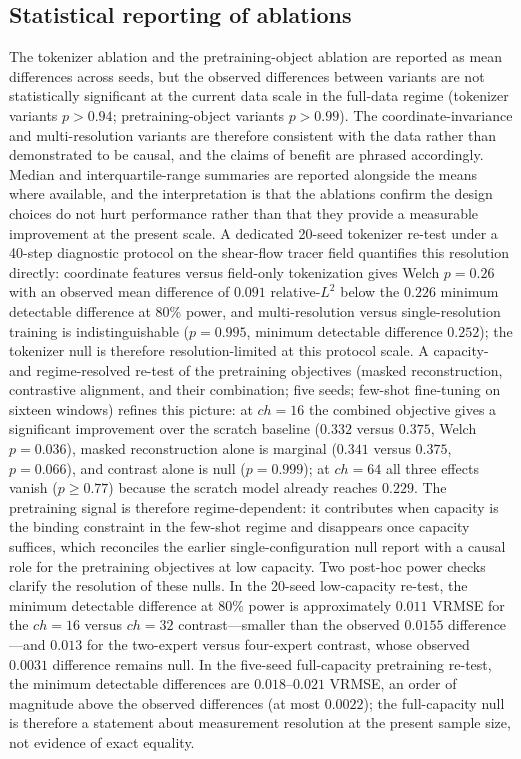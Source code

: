 \documentclass[preprint,12pt]{elsarticle}
\begin{document}
\subsection{Statistical reporting of ablations}
The tokenizer ablation and the pretraining-object ablation are reported as mean differences across
seeds, but the observed differences between variants are not statistically significant at the
current data scale in the full-data regime (tokenizer variants $p>0.94$; pretraining-object variants
$p>0.99$). The coordinate-invariance and multi-resolution variants are therefore consistent with the
data rather than demonstrated to be causal, and the claims of benefit are phrased accordingly. Median
and interquartile-range summaries are reported alongside the means where available, and the
interpretation is that the ablations confirm the design choices do not hurt performance rather than
that they provide a measurable improvement at the present scale. A dedicated 20-seed tokenizer
re-test under a 40-step diagnostic protocol on the shear-flow tracer field quantifies this
resolution directly: coordinate features versus field-only tokenization gives Welch $p=0.26$ with
an observed mean difference of $0.091$ relative-$L^2$ below the $0.226$ minimum detectable
difference at 80\% power, and multi-resolution versus single-resolution training is
indistinguishable ($p=0.995$, minimum detectable difference $0.252$); the tokenizer null is
therefore resolution-limited at this protocol scale. A capacity- and regime-resolved
re-test of the pretraining objectives (masked reconstruction, contrastive alignment, and their
combination; five seeds; few-shot fine-tuning on sixteen windows) refines this picture: at $ch=16$
the combined objective gives a significant improvement over the scratch baseline ($0.332$ versus
$0.375$, Welch $p=0.036$), masked reconstruction alone is marginal ($0.341$ versus $0.375$,
$p=0.066$), and contrast alone is null ($p=0.999$); at $ch=64$ all three effects vanish
($p\ge0.77$) because the scratch model already reaches $0.229$. The pretraining signal is therefore
regime-dependent: it contributes when capacity is the binding constraint in the few-shot regime and
disappears once capacity suffices, which reconciles the earlier single-configuration null report
with a causal role for the pretraining objectives at low capacity. Two post-hoc power checks
clarify the resolution of these nulls. In the 20-seed low-capacity re-test, the minimum detectable
difference at 80\% power is approximately $0.011$ VRMSE for the $ch=16$ versus $ch=32$ contrast---smaller than the observed $0.0155$ difference---and $0.013$ for the two-expert versus four-expert
contrast, whose observed $0.0031$ difference remains null. In the five-seed full-capacity
pretraining re-test, the minimum detectable differences are $0.018$--$0.021$ VRMSE, an order of
magnitude above the observed differences (at most $0.0022$); the full-capacity null is therefore a
statement about measurement resolution at the present sample size, not evidence of exact equality.
\end{document}
